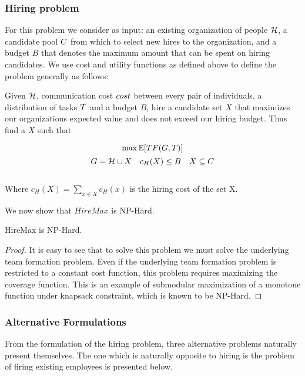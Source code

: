 \subsubsection{Hiring problem}

For this problem we consider as input: an existing organization of people $\mathcal{H}$, a candidate pool ${C}$ from which to select new hires to the organization, and a budget $B$ that denotes the maximum amount that can be spent on hiring candidates.
We use cost and utility functions as defined above to define the problem generally as follows:
\begin{problem}
[HireMax] Given $\mathcal{H}$, communication cost $cost$ between every pair of individuals, a distribution of tasks $\mathcal{T}$ and a budget $B$, hire a candidate set $X$ that maximizes our organizations expected value and does not exceed our hiring budget. Thus find a $X$ such that

$$ \max \mathbb{E}[TF(G,T)]  $$
$$ G=\mathcal{H}  \cup X \quad c_H(X) \le B \quad X \subseteq C $$\\
Where $c_H(X) = \sum_{x \in X} c_H(x)$ is the hiring cost of the set X.\\
 
\end{problem}
    
We now show that $HireMax$ is NP-Hard.

\begin{theorem} \label{thm:HM-hardness}
HireMax is NP-Hard.
\end{theorem}

\begin{proof}
It is easy to see that to solve this problem we must solve the underlying team formation problem. Even if the underlying team formation problem is restricted to a constant cost function, this problem requires maximizing the coverage function. This is an example of submodular maximization of a monotone function under knapsack constraint, which is known to be NP-Hard.  
\end{proof}

\subsubsection{Alternative Formulations}

From the formulation of the hiring problem, three alternative problems naturally present themselves. The one which is naturally opposite to hiring is the problem of firing existing employees is presented below.  

